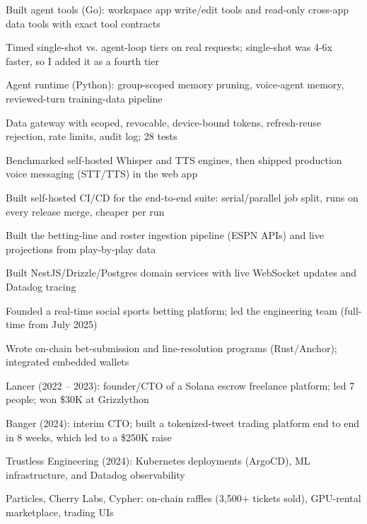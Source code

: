 \documentclass[print]{jack-resume}
\begin{document}
\begin{tightemize}
    \item Built agent tools (Go): workspace app write/edit tools and read-only cross-app data tools with exact tool contracts
    \item Timed single-shot vs. agent-loop tiers on real requests; single-shot was 4-6x faster, so I added it as a fourth tier
    \item Agent runtime (Python): group-scoped memory pruning, voice-agent memory, reviewed-turn training-data pipeline
    \item Data gateway with scoped, revocable, device-bound tokens, refresh-reuse rejection, rate limits, audit log; 28 tests
    \item Benchmarked self-hosted Whisper and TTS engines, then shipped production voice messaging (STT/TTS) in the web app
    \item Built self-hosted CI/CD for the end-to-end suite: serial/parallel job split, runs on every release merge, cheaper per run
\end{tightemize}
\sectionsep

\begin{tightemize}
    \item Built the betting-line and roster ingestion pipeline (ESPN APIs) and live projections from play-by-play data
    \item Built NestJS/Drizzle/Postgres domain services with live WebSocket updates and Datadog tracing
    \item Founded a real-time social sports betting platform; led the engineering team (full-time from July 2025)
    \item Wrote on-chain bet-submission and line-resolution programs (Rust/Anchor); integrated embedded wallets
\end{tightemize}
\sectionsep

\begin{tightemize}
    \item Lancer (2022 – 2023): founder/CTO of a Solana escrow freelance platform; led 7 people; won \$30K at Grizzlython
    \item Banger (2024): interim CTO; built a tokenized-tweet trading platform end to end in 8 weeks, which led to a \$250K raise
    \item Trustless Engineering (2024): Kubernetes deployments (ArgoCD), ML infrastructure, and Datadog observability
    \item Particles, Cherry Labs, Cypher: on-chain raffles (3,500+ tickets sold), GPU-rental marketplace, trading UIs
\end{tightemize}
\sectionsep
\end{document}
